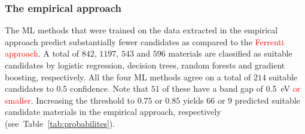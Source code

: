 \documentclass[superscriptaddress,unsortedaddress,
 amsmath,amssymb,
 aps,
]{revtex4-2}
\newcommand{\mrk}[1]{\textcolor{red}{#1}}
\begin{document}
 
\subsubsection*{The empirical approach}
The ML methods that were trained on the data extracted in the empirical approach predict substantially fewer candidates as compared to the \mrk{Ferrenti approach}. 
A total of $842$, $1197$, $543$ and $596$ materials are classified as suitable candidates by logistic regression, decision trees, random forests and gradient boosting, respectively. All the four ML methods agree on a total of $214$ suitable candidates to $0.5$ confidence.   
Note that $51$ of these have a band gap of \SI{0.5}{\electronvolt} \mrk{or smaller}. Increasing the threshold to $0.75$ or $0.85$ yields $66$ or $9$ predicted suitable candidate materials in the empirical approach, respectively (see~Table~\ref{tab:probabilites}). 
\end{document}

